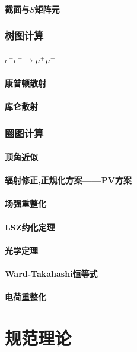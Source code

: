 \documentclass[a4paper,11pt]{article}
\theoremstyle{mystyle}
\begin{document}
\subsection{截面与$S$矩阵元}
\section{树图计算}
\subsection{$e^+e^-\rightarrow\mu^+\mu^-$}
\subsection{康普顿散射}
\subsection{库仑散射}
\section{圈图计算}
\subsection{顶角近似}
\subsection{辐射修正,正规化方案——PV方案}
\subsection{场强重整化}
\subsection{LSZ约化定理}
\subsection{光学定理}
\subsection{Ward-Takahashi恒等式}
\subsection{电荷重整化}
\part{规范理论}
\end{document}
